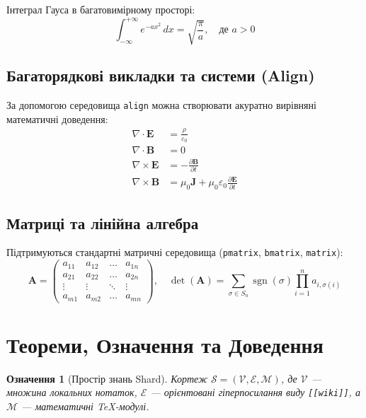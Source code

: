 \documentclass[11pt, a4paper]{article}
\newtheorem{definition}{Означення}[section]
\begin{document}
Інтеграл Гауса в багатовимірному просторі:
\begin{equation}
\label{eq:gauss}
\int_{-\infty}^{+\infty} e^{-a x^2} \, dx = \sqrt{\frac{\pi}{a}}, \quad \text{де } a > 0
\end{equation}

\subsection{Багаторядкові викладки та системи (Align)}
За допомогою середовища \texttt{align} можна створювати акуратно вирівняні математичні доведення:
\begin{align}
\nabla \cdot \mathbf{E} &= \frac{\rho}{\varepsilon_0} \label{eq:maxwell1} \\
\nabla \cdot \mathbf{B} &= 0 \label{eq:maxwell2} \\
\nabla \times \mathbf{E} &= -\frac{\partial \mathbf{B}}{\partial t} \label{eq:maxwell3} \\
\nabla \times \mathbf{B} &= \mu_0 \mathbf{J} + \mu_0 \varepsilon_0 \frac{\partial \mathbf{E}}{\partial t} \label{eq:maxwell4}
\end{align}

\subsection{Матриці та лінійна алгебра}
Підтримуються стандартні матричні середовища (\texttt{pmatrix}, \texttt{bmatrix}, \texttt{matrix}):
\begin{equation}
\mathbf{A} = 
\begin{pmatrix}
a_{11} & a_{12} & \dots & a_{1n} \\
a_{21} & a_{22} & \dots & a_{2n} \\
\vdots & \vdots & \ddots & \vdots \\
a_{m1} & a_{m2} & \dots & a_{mn}
\end{pmatrix},
\quad
\det(\mathbf{A}) = \sum_{\sigma \in S_n} \operatorname{sgn}(\sigma) \prod_{i=1}^n a_{i, \sigma(i)}
\end{equation}

\section{Теореми, Означення та Доведення}
\label{sec:theorems}

\begin{definition}[Простір знань Shard]
Кортеж $\mathcal{S} = (\mathcal{V}, \mathcal{E}, \mathcal{M})$, де $\mathcal{V}$ — множина локальних нотаток, $\mathcal{E}$ — орієнтовані гіперпосилання виду \texttt{[[wiki]]}, а $\mathcal{M}$ — математичні \TeX-модулі.
\end{definition}
\end{document}
